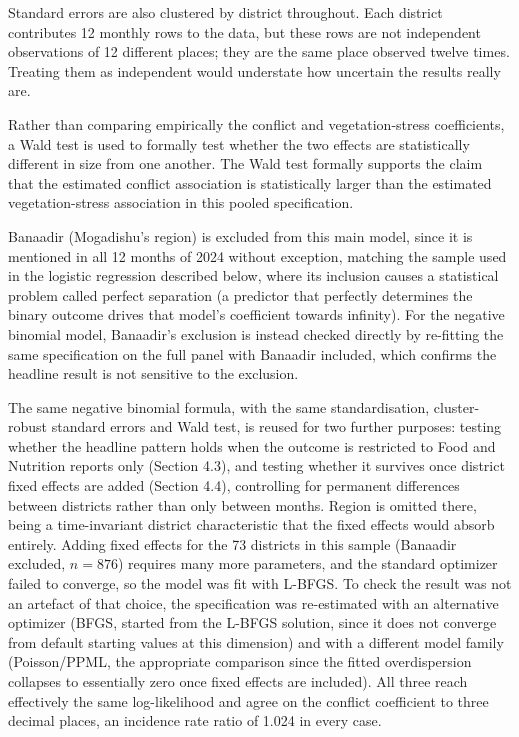 \documentclass[12pt,a4paper]{article}
\begin{document}
Standard errors are also clustered by district throughout. Each district contributes 12 monthly rows to the data, but these rows are not independent observations of 12 different places; they are the same place observed twelve times. Treating them as independent would understate how uncertain the results really are.

Rather than comparing empirically the conflict and vegetation-stress coefficients, a Wald test is used to formally test whether the two effects are statistically different in size from one another. The Wald test formally supports the claim that the estimated conflict association is statistically larger than the estimated vegetation-stress association in this pooled specification.

Banaadir (Mogadishu's region) is excluded from this main model, since it is mentioned in all 12 months of 2024 without exception, matching the sample used in the logistic regression described below, where its inclusion causes a statistical problem called perfect separation (a predictor that perfectly determines the binary outcome drives that model's coefficient towards infinity). For the negative binomial model, Banaadir's exclusion is instead checked directly by re-fitting the same specification on the full panel with Banaadir included, which confirms the headline result is not sensitive to the exclusion.

The same negative binomial formula, with the same standardisation, cluster-robust standard errors and Wald test, is reused for two further purposes: testing whether the headline pattern holds when the outcome is restricted to Food and Nutrition reports only (Section 4.3), and testing whether it survives once district fixed effects are added (Section 4.4), controlling for permanent differences between districts rather than only between months. Region is omitted there, being a time-invariant district characteristic that the fixed effects would absorb entirely. Adding fixed effects for the 73 districts in this sample (Banaadir excluded, $n = 876$) requires many more parameters, and the standard optimizer failed to converge, so the model was fit with L-BFGS. To check the result was not an artefact of that choice, the specification was re-estimated with an alternative optimizer (BFGS, started from the L-BFGS solution, since it does not converge from default starting values at this dimension) and with a different model family (Poisson/PPML, the appropriate comparison since the fitted overdispersion collapses to essentially zero once fixed effects are included). All three reach effectively the same log-likelihood and agree on the conflict coefficient to three decimal places, an incidence rate ratio of 1.024 in every case.
\end{document}

